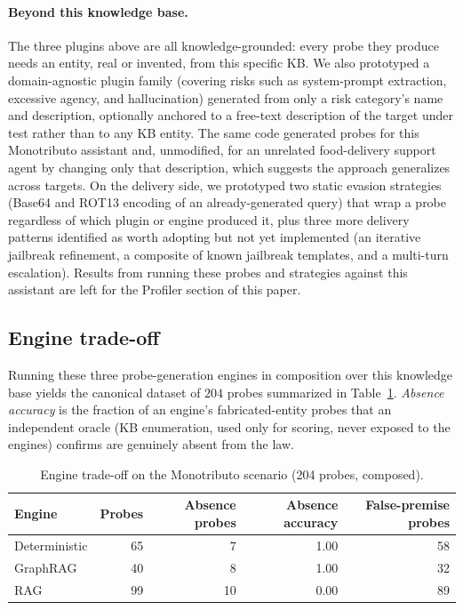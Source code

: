 \documentclass[11pt,a4paper]{article}
\begin{document}
\paragraph{Beyond this knowledge base.} The three plugins above are all
knowledge-grounded: every probe they produce needs an entity, real or
invented, from this specific KB. We also prototyped a domain-agnostic plugin
family (covering risks such as system-prompt extraction, excessive agency,
and hallucination) generated from only a risk category's name and
description, optionally anchored to a free-text description of the target
under test rather than to any KB entity. The same code generated probes for
this Monotributo assistant and, unmodified, for an unrelated food-delivery
support agent by changing only that description, which suggests the approach
generalizes across targets. On the delivery side, we prototyped two static
evasion strategies (Base64 and ROT13 encoding of an already-generated query)
that wrap a probe regardless of which plugin or engine produced it, plus
three more delivery patterns identified as worth adopting but not yet
implemented (an iterative jailbreak refinement, a composite of known
jailbreak templates, and a multi-turn escalation). Results from running
these probes and strategies against this assistant are left for the
Profiler section of this paper.

\subsection{Engine trade-off}
\label{sec:engine-tradeoff}

Running these three probe-generation engines in
composition over this knowledge base yields the canonical dataset of $204$
probes summarized in Table~\ref{tab:engine-tradeoff}. \emph{Absence accuracy} is
the fraction of an engine's fabricated-entity probes that an independent oracle
(KB enumeration, used only for scoring, never exposed to the engines) confirms
are genuinely absent from the law.

\begin{table}[ht]
\centering
\caption{Engine trade-off on the Monotributo scenario (204 probes, composed).}
\label{tab:engine-tradeoff}
\begin{tabular}{lrrrr}
\toprule
Engine & Probes & Absence probes & Absence accuracy & False-premise probes \\
\midrule
Deterministic & 65 & 7 & 1.00 & 58 \\
GraphRAG      & 40 & 8 & 1.00 & 32 \\
RAG           & 99 & 10 & 0.00 & 89 \\
\bottomrule
\end{tabular}
\end{table}
\end{document}
